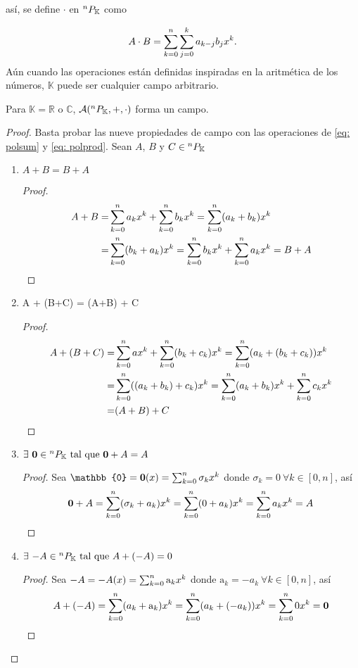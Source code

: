 así, se define \textbf{$\cdot$}  en ${^{n}P_{\mathbb{K}}}$ como

\begin{equation}
A \cdot B = \sum_{k=0}^n \sum_{j=0}^k a_{k-j}b_j x^k.
\label{eq: polprod}
\end{equation}
Aún cuando las operaciones están definidas inspiradas en la aritmética de los números, $\mathbb{K}$ puede ser cualquier campo arbitrario.

\begin{proposicion}
Para $\mathbb{K} = \mathbb{R}$ o $\mathbb{C}$, $\mathcal{A}(^{n}P_{\mathbb{K}},+,\cdot)$ forma un campo.
\end{proposicion}

\begin{proof}
Basta probar las nueve propiedades de campo con las operaciones de \ref{eq: polsum} y \ref{eq: polprod}.
Sean $A$, $B$ y $C \in {^{n}P_{\mathbb{K}}}$
\begin{enumerate}

 \item $ A + B = B + A $
 \begin{proof}
  \begin{align*}
   A + B =& \sum_{k=0}^n a_k x^k + \sum_{k=0}^n b_k x^k  = \sum_{k=0}^n (a_k + b_k) x^k \\ 
   =& \sum_{k=0}^n (b_k + a_k) x^k = \sum_{k=0}^n b_k x^k +     \sum_{k=0}^n a_k x^k = B + A
  \end{align*}
 \end{proof}
 
 \item A + (B+C) = (A+B) + C
 \begin{proof}
  \begin{align*}
   A + (B+C) =& \sum_{k=0}^n a x^k + \sum_{k=0}^n (b_k+c_k) x^k = \sum_{k=0}^n (a_k + (b_k + c_k)) x^k \\
   =&  \sum_{k=0}^n ((a_k + b_k) + c_k) x^k = \sum_{k=0}^n (a_k+b_k) x^k + \sum_{k=0}^n c_k x^k \\
   =& (A+B) + C 
  \end{align*}
 \end{proof}
 
 \item $\exists \  \bm{0} \in {^{n}P_{\mathbb{K}}} \text{ tal que }  \bm{0} + A = A $
 \begin{proof}
 Sea $\mathbb{0} = \bm{0}(x) = \polk{\sigma_k}$ donde $\sigma_k = 0 \ \forall k \in [0,n]$, así 
  \begin{align*}
  \bm{0} + A = \sum_{k=0}^n (\sigma_k + a_k) x^k = \sum_{k=0}^n (0 + a_k) x^k = \sum_{k=0}^n a_k x^k = A
  \end{align*}
 \end{proof}
 
 \item $\exists \ {-A} \in{^{n}P_{\mathbb{K}}}  \text{ tal que } A + (-A) = 0 $
 \begin{proof}
 Sea $-A = -A(x) = \sum_{k=0}^n \mathrm{a}_k x^k$ donde $\mathrm{a}_k = -a_k \ \forall k \in [0,n]$, así
  \begin{align*}
   A + (-A) = \sum_{k=0}^n (a_k + \mathrm{a}_k) x^k = \sum_{k=0}^n (a_k + (-a_k)) x^k = \sum_{k=0}^n 0 x^k = \bm{0}
  \end{align*}
 \end{proof}
 

\end{enumerate}
\end{proof}
